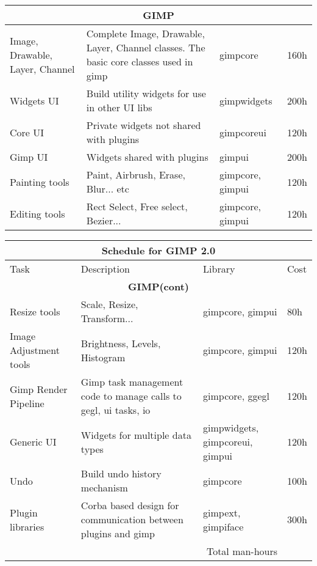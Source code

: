 \begin{flushleft}
\begin{tabular}{|p{2cm}|p{5cm}|p{2cm}|l|}
\multicolumn{4}{|c|}{\bf GIMP}\\
\hline 
Image, Drawable, Layer, Channel & Complete Image, Drawable, Layer, Channel classes. The basic core classes used in gimp & gimpcore & 160h\\
\hline 
Widgets UI & Build utility widgets for use in other UI libs  & gimpwidgets & 200h\\
\hline
Core UI & Private widgets not shared with plugins & gimpcoreui & 120h\\
\hline
Gimp UI & Widgets shared with plugins & gimpui & 200h\\
\hline 
Painting tools & Paint, Airbrush, Erase, Blur... etc & gimpcore, gimpui & 120h \\
\hline 
Editing tools & Rect Select, Free select, Bezier... & gimpcore, gimpui & 120h \\
\hline 
\end{tabular}

\begin{tabular}{|p{2cm}|p{5cm}|p{2cm}|l|}\hline
\multicolumn{4}{|c|}{\rule[-3mm]{0mm}{8mm} \large \bf Schedule for GIMP 2.0}\\  
\hline
Task & Description & Library & Cost\\ 
\hline 
\multicolumn{4}{|c|}{\bf GIMP(cont)}\\
\hline 
Resize tools & Scale, Resize, Transform... & gimpcore, gimpui & 80h \\
\hline 
Image Adjustment tools & Brightness, Levels, Histogram & gimpcore, gimpui & 120h\\
\hline
Gimp Render Pipeline & Gimp task management code to manage calls to gegl, ui tasks, io & gimpcore, ggegl & 120h \\
\hline 
Generic UI & Widgets for multiple data types & gimpwidgets, gimpcoreui, gimpui & 120h\\
\hline
Undo & Build undo history mechanism & gimpcore & 100h\\
\hline
Plugin libraries & Corba based design for communication between plugins and gimp & gimpext, gimpiface & 300h\\
\hline

\multicolumn{3}{|r|}{Total man-hours} & \\
\hline
\end{tabular}
\end{flushleft}

	
